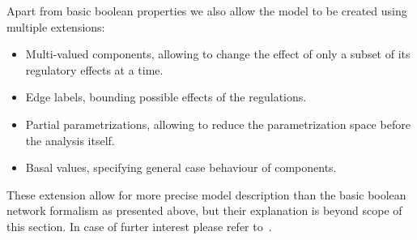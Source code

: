 \documentclass[12pt]{article}
\begin{document}
Apart from basic boolean properties we also allow the model to be created using multiple extensions:
\begin{itemize}
\item Multi-valued components, allowing to change the effect of only a subset of its regulatory effects at a time.
\item Edge labels, bounding possible effects of the regulations.
\item Partial parametrizations, allowing to reduce the parametrization space before the analysis itself.
\item Basal values, specifying general case behaviour of components.
\end{itemize}

These extension allow for more precise model description than the basic boolean network formalism as presented above, but their explanation is beyond scope of this section. In case of furter interest please refer to~\cite{TechReport}.



\end{document}
